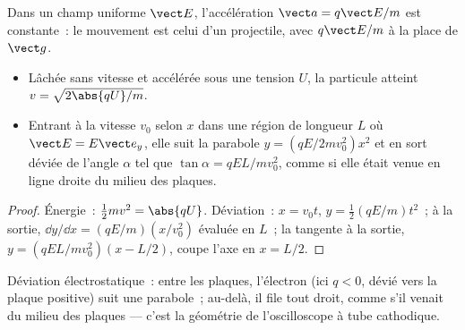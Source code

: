 \begin{proposition}\label{prop:b1:charged-particles:efield}
Dans un champ uniforme $\vect E$, l'accélération $\vect a = q\vect E/m$
est constante~: le mouvement est celui d'un projectile, avec
$q\vect E/m$ à la place de $\vect g$.
\begin{itemize}
  \item Lâchée sans vitesse et accélérée sous une tension $U$, la
        particule atteint $v = \sqrt{2\abs{qU}/m}$.
  \item Entrant à la vitesse $v_0$ selon $x$ dans une région de longueur
        $L$ où $\vect E = E\vect e_y$, elle suit la parabole $y = (qE/2mv_0^2)x^2$
        et en sort déviée de l'angle $\alpha$ tel que $\tan\alpha =
        qEL/mv_0^2$, comme si elle était venue en ligne droite du milieu
        des plaques.
\end{itemize}
\end{proposition}

\begin{proof}
Énergie~: $\tfrac12 mv^2 = \abs{qU}$. Déviation~: $x = v_0t$, $y =
\tfrac12(qE/m)t^2$~; à la sortie, $\dd y/\dd x = (qE/m)(x/v_0^2)$ évaluée
en $L$~; la tangente à la sortie, $y = (qEL/mv_0^2)(x - L/2)$, coupe
l'axe en $x = L/2$.
\end{proof}

\begin{omfigure}

{\small Déviation électrostatique~: entre les plaques, l'électron (ici
$q < 0$, dévié vers la plaque positive) suit une parabole~; au-delà, il
file tout droit, comme s'il venait du milieu des plaques --- c'est la
géométrie de l'oscilloscope à tube cathodique.}
\end{omfigure}

